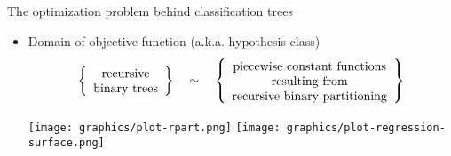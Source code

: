 

\begin{frame}{\vskip -0.2cm \large The optimization problem behind classification trees}

\large
\begin{itemize}
\item
	{\Large Domain of objective function} {\small (a.k.a. hypothesis class)}
	{\scriptsize\begin{equation*}
	\left\{\begin{array}{c}
		\overset{{\color{white}.}}{\textnormal{recursive}} \\
		\textnormal{binary trees}
	\end{array}\right\}
	\quad\sim\quad
	\left\{\begin{array}{c}
		\overset{{\color{white}.}}{\textnormal{piecewise constant functions}} \\
		\textnormal{resulting from} \\
		\textnormal{recursive binary partitioning}
	\end{array}\right\}
	\end{equation*}}
	\begin{center}
	\texttt{[image: graphics/plot-rpart.png]}
	\quad\quad\quad\quad\;\;
	\texttt{[image: graphics/plot-regression-surface.png]}
	\;\;{\color{white}1}
	\end{center}
\end{itemize}


\end{frame}
\normalsize


